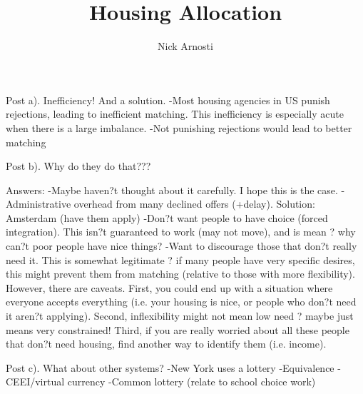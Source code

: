 \documentclass[11pt, oneside]{article}   	%
\title{Housing Allocation}
\author{Nick Arnosti}
\begin{document}
\maketitle



Post a). Inefficiency! And a solution.
-Most housing agencies in US punish rejections, leading to inefficient matching. This inefficiency is especially acute when there is a large imbalance.
-Not punishing rejections would lead to better matching




Post b). Why do they do that???

Answers:
-Maybe haven?t thought about it carefully. I hope this is the case.
-Administrative overhead from many declined offers (+delay). Solution: Amsterdam (have them apply)
-Don?t want people to have choice (forced integration). This isn?t guaranteed to work (may not move), and is mean ? why can?t poor people have nice things?
-Want to discourage those that don?t really need it. This is somewhat legitimate ? if many people have very specific desires, this might prevent them from matching (relative to those with more flexibility). However, there are caveats. First, you could end up with a situation where everyone accepts everything (i.e. your housing is nice, or people who don?t need it aren?t applying). Second, inflexibility might not mean low need ? maybe just means very constrained! Third, if you are really worried about all these people that don?t need housing, find another way to identify them (i.e. income).

Post c). What about other systems?
-New York uses a lottery
-Equivalence
-CEEI/virtual currency
-Common lottery (relate to school choice work)
\end{document}
